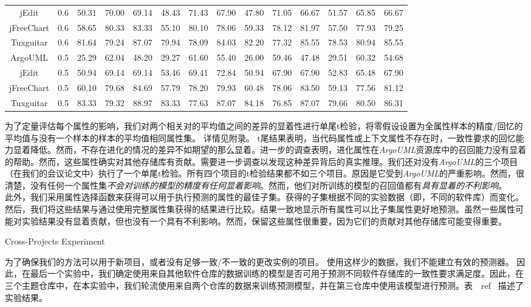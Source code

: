 \begin{table}[htbp]
\begin{tabular}{cccccccccccccc}
jEdit&0.6&	50.31&	70.00&	69.14&	48.43&	71.43&	67.90&	47.80&	71.05&	66.67&	51.57&	65.85&	66.67\\
jFreeChart&0.6&	58.65&	80.33&	83.33&	55.10&	80.10&	78.06&	59.33&	78.12&	81.97&	57.50&	77.93&	79.25\\
Tuxguitar&0.6&	81.64&	79.24&	87.07&	79.94&	78.09&	84.03&	82.20&	77.32&	85.55&	78.53&	80.94&	85.55\\
ArgoUML&0.5&	25.29&	62.04&	48.20&	29.27&	61.60&	55.40&	26.00&	59.46&	47.48&	29.51&	60.32&	54.68\\
jEdit&0.5&	50.94&	69.14&	69.14&	53.46&	69.41&	72.84&	50.94&	67.90&	67.90&	52.83&	65.48&	67.90\\
jFreeChart&0.5&	60.10&	79.68&	84.69&	57.79&	78.20&	79.93&	60.48&	78.06&	83.50&	59.13&	77.56&	81.12\\
Tuxguitar&0.5&	83.33&	79.32&	88.97&	83.33&	77.63&	87.07&	84.18&	76.85&	87.07&	79.66&	80.50&      86.31\\
\bottomrule[1.5pt]
\end{tabular}
\end{table}

为了定量评估每个属性的影响，我们对两个相关对的平均值之间的差异的显着性进行单尾t检验，将零假设设置为全属性样本的精度/回忆的平均值与没有一个样本的样本的平均值相同属性集。
详情见附录。 t尾结果表明，当代码属性或上下文属性不存在时，一致性要求的回忆能力显着降低。然而，不存在进化的情况的差异不如期望的那么显着。进一步的调查表明，进化属性在{\em ArgoUML}资源库中的召回能力没有显着的帮助。然而，这些属性确实对其他存储库有贡献。需要进一步调查以发现这种差异背后的真实推理。{我们还对没有{\em  ArgoUML}的三个项目（在我们的会议论文中）执行了一个单尾t检验。所有四个项目的t检验结果都不如三个项目。原因是它受到{\em ArgoUML}的严重影响。}然而，很清楚，没有任何一个属性集{\em 不会对训练的模型的精度有任何显着影响}。然而，他们对所训练的模型的召回值都有{\em 具有显着的不利影响}。 \\

此外，我们采用属性选择函数来获得可以用于执行预测的属性的最佳子集。获得的子集根据不同的实验数据（即，不同的软件库）而变化。然后，我们将这些结果与通过使用完整属性集获得的结果进行比较。结果一致地显示所有属性可以比子集属性更好地预测。虽然一些属性可能对实验结果没有显着贡献，但也没有一个具有不利影响。然而，保留这些属性很重要，因为它们的贡献对其他存储库可能变得重要。

{Cross-Projects Experiment}

为了确保我们的方法可以用于新项目，或者没有足够一致/不一致的更改实例的项目。 使用这样少的数据，我们不能建立有效的预测器。 因此，在最后一个实验中，我们确定使用来自其他软件仓库的数据训练的模型是否可用于预测不同软件存储库的一致性要求满足度。因此，在三个主题仓库中，在本实验中，我们轮流使用来自两个仓库的数据来训练预测模型，并在第三仓库中使用该模型进行预测。表~\ ref {}~描述了实验结果。

